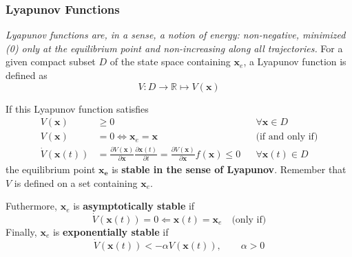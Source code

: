 \subsubsection{Lyapunov Functions}
\textit{Lyapunov functions are, in a sense, a notion of energy: non-negative, minimized (0) only at the equilibrium point and non-increasing along all trajectories.}
\newpar{}
For a given compact subset $D$ of the state space containing $\mathbf{x}_e$, a Lyapunov function is defined as
\noindent\begin{equation*}
    V:D \to \mathbb{R} \mapsto V(\mathbf{x})
\end{equation*}

If this Lyapunov function satisfies
\noindent\begin{align*}
    V(\mathbf{x})          & \geq 0                                                                                                                                                                   &  & \forall \mathbf{x}\in D    \\
    V(\mathbf{x})          & = 0 \Leftrightarrow \mathbf{x}_e = \mathbf{x}                                                                                                                            &  & \text{(if and only if)}    \\
    \dot{V}(\mathbf{x}(t)) & = \frac{\partial V(\mathbf{x})}{\partial \mathbf{x}} \frac{\partial \mathbf{x}(t)}{\partial t} = \frac{\partial V(\mathbf{x})}{\partial \mathbf{x}} f(\mathbf{x}) \leq 0 &  & \forall \mathbf{x}(t)\in D
\end{align*}
the equilibrium point $\mathbf{x_e}$ is \textbf{stable in the sense of Lyapunov}. Remember that $V$ is defined on a set containing $\mathbf{x}_e$.

\newpar{}
Futhermore, $\mathbf{x}_e$ is \textbf{asymptotically stable} if
\noindent\begin{equation*}
    \dot{V}(\mathbf{x}(t)) = 0 \Leftarrow \mathbf{x}(t) = \mathbf{x}_e \quad \text{(only if)}
\end{equation*}
Finally, $\mathbf{x}_e$ is \textbf{exponentially stable} if
\noindent\begin{equation*}
    \dot{V}(\mathbf{x}(t)) < -\alpha V(\mathbf{x}(t)), \qquad \alpha>0
\end{equation*}

